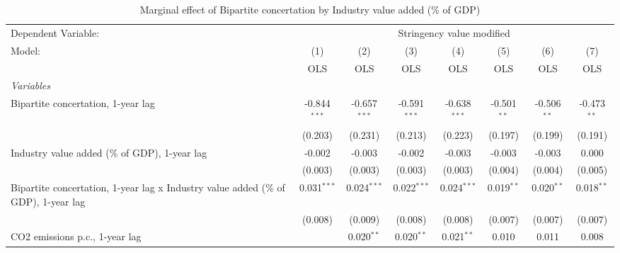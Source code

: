 
\begin{table}[htbp]
   \caption{Marginal effect of Bipartite concertation by Industry value added (\% of GDP)}
   \centering
   \begin{tabular}{lccccccc}
      \toprule
      Dependent Variable: & \multicolumn{7}{c}{Stringency value modified}\\
      Model:                                                                             & (1)            & (2)            & (3)            & (4)            & (5)           & (6)           & (7)\\  
                                                                                         &  OLS           & OLS            & OLS            & OLS            & OLS           & OLS           & OLS\\  
      \midrule
      \emph{Variables}\\
      Bipartite concertation, 1-year lag                                                 & -0.844$^{***}$ & -0.657$^{***}$ & -0.591$^{***}$ & -0.638$^{***}$ & -0.501$^{**}$ & -0.506$^{**}$ & -0.473$^{**}$\\   
                                                                                         & (0.203)        & (0.231)        & (0.213)        & (0.223)        & (0.197)       & (0.199)       & (0.191)\\   
      Industry value added (\% of GDP), 1-year lag                                       & -0.002         & -0.003         & -0.002         & -0.003         & -0.003        & -0.003        & 0.000\\   
                                                                                         & (0.003)        & (0.003)        & (0.003)        & (0.003)        & (0.004)       & (0.004)       & (0.005)\\   
      Bipartite concertation, 1-year lag x Industry value added (\% of GDP), 1-year lag  & 0.031$^{***}$  & 0.024$^{***}$  & 0.022$^{***}$  & 0.024$^{***}$  & 0.019$^{**}$  & 0.020$^{**}$  & 0.018$^{**}$\\   
                                                                                         & (0.008)        & (0.009)        & (0.008)        & (0.008)        & (0.007)       & (0.007)       & (0.007)\\   
      CO2 emissions p.c., 1-year lag                                                     &                & 0.020$^{**}$   & 0.020$^{**}$   & 0.021$^{**}$   & 0.010         & 0.011         & 0.008\\   

\end{tabular}
\end{table}
